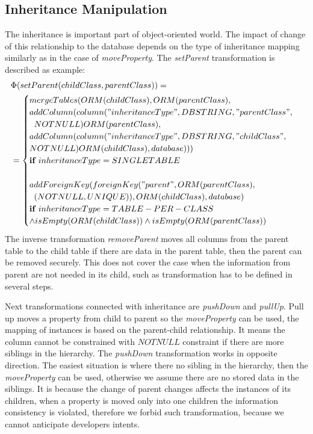 \documentclass[runningheads]{comsis}
\begin{document}
\subsection{Inheritance Manipulation}
\label{sec:inheritance}
The inheritance is important part of object-oriented world. The impact of change of this relationship to the database depends on the type of inheritance mapping similarly as in the case of \emph{moveProperty}. The \emph{setParent} transformation is described as example:
\begin{align}
&\Phi(setParent(childClass, parentClass)) = \nonumber \\
&= \begin{cases}
mergeTables(ORM(childClass), ORM(parentClass),\\
addColumn(column("inheritanceType", DBSTRING, "parentClass", \\ \; \; NOTNULL) ORM(parentClass), \\
     addColumn(column("inheritanceType", DBSTRING, "childClass", \\ NOTNULL) ORM(childClass), database))) \\
     \mathbf{if} \; inheritanceType = SINGLETABLE 
     \\\\
     addForeignKey(foreignKey("parent", ORM(parentClass), \\
     \; \; (NOTNULL, UNIQUE)), ORM(childClass), database) \\
     \mathbf{if} \; inheritanceType = TABLE-PER-CLASS \\ \wedge  
     isEmpty(ORM(childClass)) \wedge isEmpty(ORM(parentClass))
 \end{cases}
\end{align}
The inverse transformation \emph{removeParent} moves all columns from the parent table to the child table if there are data in the parent table, then the parent can be removed securely. This does not cover the case when the information from parent are not needed in its child, such as transformation has to be defined in several steps. 

Next transformations connected with inheritance are \emph{pushDown} and \emph{pullUp}. Pull up moves a property from child to parent so the \emph{moveProperty} can be used, the mapping of instances is based on the parent-child relationship. It means the column cannot be constrained with $NOTNULL$ constraint if there are more siblings in the hierarchy. The \emph{pushDown} transformation works in opposite direction. The easiest situation is where there no sibling in the hierarchy, then the \emph{moveProperty} can be used, otherwise we assume there are no stored data in the siblings. It is because the change of parent changes affects the instances of its children, when a property is moved only into one children the information consistency is violated, therefore we forbid such transformation, because we cannot anticipate developers intents.
\end{document}
